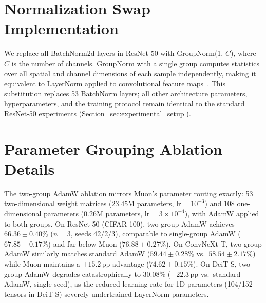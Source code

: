 \section{Normalization Swap Implementation}\label{sec:normswap_details}

We replace all BatchNorm2d layers in ResNet-50 with GroupNorm(1, $C$), where $C$ is the number of channels.
GroupNorm with a single group computes statistics over all spatial and channel dimensions of each sample independently, making it equivalent to LayerNorm applied to convolutional feature maps~\cite{wu2018group}.
This substitution replaces 53 BatchNorm layers; all other architecture parameters, hyperparameters, and the training protocol remain identical to the standard ResNet-50 experiments (Section~\ref{sec:experimental_setup}).

\section{Parameter Grouping Ablation Details}\label{sec:ablation_details}

The two-group AdamW ablation mirrors Muon's parameter routing exactly: 53 two-dimensional weight matrices ($23.45$M parameters, $\text{lr}{=}10^{-3}$) and 108 one-dimensional parameters ($0.26$M parameters, $\text{lr}{=}3{\times}10^{-4}$), with AdamW applied to both groups.
On ResNet-50 (CIFAR-100), two-group AdamW achieves $66.36 \pm 0.40\%$ ($n{=}3$, seeds 42/2/3), comparable to single-group AdamW ($67.85 \pm 0.17\%$) and far below Muon ($76.88 \pm 0.27\%$).
On ConvNeXt-T, two-group AdamW similarly matches standard AdamW ($59.44 \pm 0.28\%$ vs.\ $58.54 \pm 2.17\%$) while Muon maintains a $+15.2$\,pp advantage ($74.62 \pm 0.15\%$).
On DeiT-S, two-group AdamW degrades catastrophically to $30.08\%$ ($-22.3$\,pp vs.\ standard AdamW, single seed), as the reduced learning rate for 1D parameters (104/152 tensors in DeiT-S) severely undertrained LayerNorm parameters.

